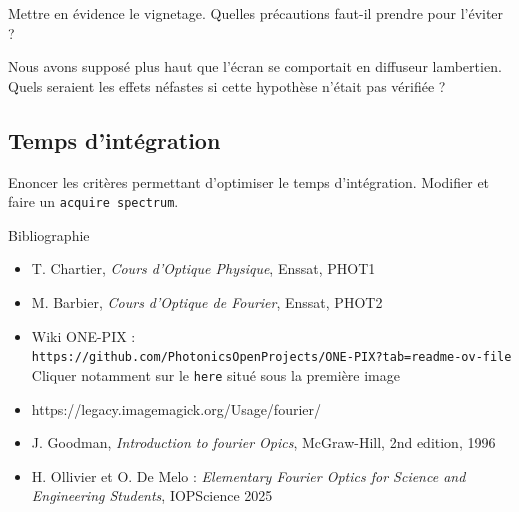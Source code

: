 \documentclass[a4paper,twoside,10pt]{book}
\begin{document}
\begin{question}[resume]
\item Mettre en évidence le vignetage. Quelles précautions faut-il prendre pour l'éviter ?
\item Nous avons supposé plus haut que l'écran se comportait en diffuseur lambertien.
Quels seraient les effets néfastes si cette hypothèse n’était pas vérifiée ?
\end{question}

\subsection{Temps d'intégration}

\begin{question}[resume]
\item Enoncer les critères permettant d’optimiser le temps d’intégration. Modifier et faire
un \verb|acquire spectrum|.
\end{question}

%
%

\vspace{-5mm}

\vskip 0.5cm
\begin{bclogo}[noborder=true,logo = \bcbook,barre=none]{\Large Bibliographie}
\vskip 0.25cm
\begin{itemize}[label=]
    \item T. Chartier, \textit{Cours d'Optique Physique}, Enssat, PHOT1
	\item M. Barbier,  \textit{Cours d'Optique de Fourier}, Enssat, PHOT2
	\item Wiki ONE-PIX :\\
	\texttt{https://github.com/PhotonicsOpenProjects/ONE-PIX?tab=readme-ov-file}\\
	Cliquer notamment sur le \texttt{here} situé sous la première image
	\item https://legacy.imagemagick.org/Usage/fourier/
	\item J. Goodman, \textit{Introduction to fourier Opics}, McGraw-Hill, 2nd edition, 1996
	\item H. Ollivier et O. De Melo : \textit{Elementary Fourier Optics for Science and Engineering Students}, IOPScience 2025
\end{itemize}
\end{bclogo}
\end{document}
